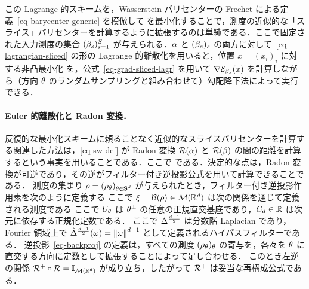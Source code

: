 この Lagrange 的スキームを，Wasserstein バリセンターの Frechet による定義~\eqref{eq-barycenter-generic} を模倣して
を最小化することで，測度の近似的な「スライス」バリセンターを計算するように拡張するのは単純である．ここで固定された入力測度の集合 $(\beta_s)_{s=1}^S$ が与えられる．$\alpha$ と $(\beta_s)_s$ の両方に対して~\eqref{eq-lagrangian-sliced} の形の Lagrange 的離散化を用いると，位置 $x=(x_i)_i$ に対する非凸最小化
を，公式~\eqref{eq-grad-sliced-lagr} を用いて $\nabla \mathcal{E}_{\beta_s}(x)$ を計算しながら（方向 $\theta$ のランダムサンプリングと組み合わせて）勾配降下法によって実行できる．




\paragraph{Euler 的離散化と Radon 変換．}

反復的な最小化スキームに頼ることなく近似的なスライスバリセンターを計算する関連した方法は，\eqref{eq-sw-def} が Radon 変換 $\mathcal{R}(\alpha)$ と $\mathcal{R}(\beta)$ の間の距離を計算するという事実を用いることである．ここで
である．決定的な点は，Radon 変換が可逆であり，その逆がフィルター付き逆投影公式を用いて計算できることである．
%
測度の集まり $\rho = (\rho_\theta)_{\theta \in \mathrm{\textbf{S}}^d}$ が与えられたとき，フィルター付き逆投影作用素を次のように定義する
ここで $\xi = \mathcal{B}(\rho) \in \mathcal{M}(\mathbb{R}^d)$ は次の関係を通じて定義される測度である
ここで $U_\theta$ は $\theta^\bot$ の任意の正規直交基底であり，$C_d \in \mathbb{R}$ は次元に依存する正規化定数である．
%
ここで $\Delta^{\frac{d-1}{2}}$ は分数階 Laplacian であり，Fourier 領域上で $\hat {\Delta}^{\frac{d-1}{2}}(\omega) = \left\| \omega \right\|^{d-1}$ として定義されるハイパスフィルターである．
%
逆投影~\eqref{eq-backproj} の定義は，すべての測度 $(\rho_\theta)_\theta$ の寄与を，各々を $\theta$ に直交する方向に定数として拡張することによって足し合わせる．
%
このとき左逆の関係 $\mathcal{R}^+ \circ \mathcal{R} = \mathbb{I}_{\mathcal{M}(\mathbb{R}^d)}$ が成り立ち，したがって $\mathcal{R}^+$ は妥当な再構成公式である．


